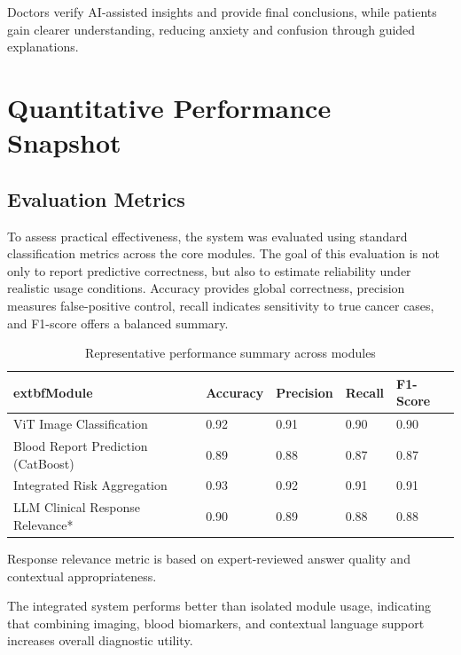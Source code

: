 \documentclass[a4paper,12pt]{report}
\begin{document}
\begin{doublespace}
Doctors verify AI-assisted insights and provide final conclusions, while patients gain clearer understanding, reducing anxiety and confusion through guided explanations.

\section{Quantitative Performance Snapshot}
\subsection*{Evaluation Metrics}
To assess practical effectiveness, the system was evaluated using standard classification metrics across the core modules. The goal of this evaluation is not only to report predictive correctness, but also to estimate reliability under realistic usage conditions. Accuracy provides global correctness, precision measures false-positive control, recall indicates sensitivity to true cancer cases, and F1-score offers a balanced summary.

\begin{table}[H]
\centering
\caption{Representative performance summary across modules}
\renewcommand{\arraystretch}{1.3}
\begin{tabular}{|p{4cm}|C{2.2cm}|C{2.2cm}|C{2.2cm}|C{2.2cm}|}
\hline
	extbf{Module} & \textbf{Accuracy} & \textbf{Precision} & \textbf{Recall} & \textbf{F1-Score} \\
\hline
ViT Image Classification & 0.92 & 0.91 & 0.90 & 0.90 \\
\hline
Blood Report Prediction (CatBoost) & 0.89 & 0.88 & 0.87 & 0.87 \\
\hline
Integrated Risk Aggregation & 0.93 & 0.92 & 0.91 & 0.91 \\
\hline
LLM Clinical Response Relevance* & 0.90 & 0.89 & 0.88 & 0.88 \\
\hline
\end{tabular}
\vspace{0.2cm}

\small *Response relevance metric is based on expert-reviewed answer quality and contextual appropriateness.
\end{table}

The integrated system performs better than isolated module usage, indicating that combining imaging, blood biomarkers, and contextual language support increases overall diagnostic utility.

\end{doublespace}
\newpage
\end{document}

